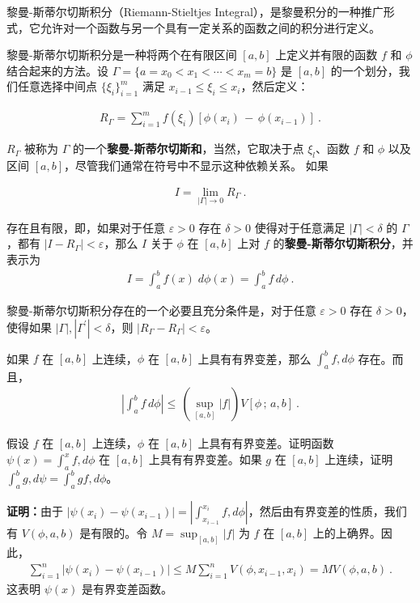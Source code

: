 
黎曼-斯蒂尔切斯积分（Riemann-Stieltjes Integral），是黎曼积分的一种推广形式，它允许对一个函数与另一个具有一定关系的函数之间的积分进行定义。

黎曼-斯蒂尔切斯积分是一种将两个在有限区间 $ [a, b] $ 上定义并有限的函数 $ f $ 和 $ \phi $ 结合起来的方法。设 $ \Gamma=\{a=x_{0}<x_{1}<\cdots<x_{m}=b\} $ 是 $ [a, b] $ 的一个划分，我们任意选择中间点 $ \{\xi_{i}\}_{i=1}^{m} $ 满足 $ x_{i-1}\leq\xi_{i}\leq x_{i} $，然后定义：

\begin{align}
R_{\Gamma}=\sum_{i=1}^{m}f(\xi_{i})[\phi(x_{i})\,-\,\phi(x_{i-1})]~.
\end{align}

$ R_{\Gamma} $ 被称为 $ \Gamma $ 的一个\textbf{黎曼-斯蒂尔切斯和}，当然，它取决于点 $ \xi_{l} $、函数 $ f $ 和 $ \phi $ 以及区间 $ [a, b] $，尽管我们通常在符号中不显示这种依赖关系。
如果

\begin{align}
I=\lim_{|\Gamma|\to0}R_{\Gamma}~.
\end{align}

存在且有限，即，如果对于任意 $ \varepsilon>0 $ 存在 $ \delta>0 $ 使得对于任意满足 $ |\Gamma|<\delta $ 的 $ \Gamma $，都有 $ |I-R_{\Gamma}|<\varepsilon $，那么 $ I $ 关于 $ \phi $ 在 $ [a, b] $ 上对 $ f $ 的\textbf{黎曼-斯蒂尔切斯积分}，并表示为
\begin{align}
I=\int_{a}^{b}\!f(x)\;d\phi(x)=\int_{a}^{b}\!f\,d\phi~.
\end{align}

黎曼-斯蒂尔切斯积分存在的一个必要且充分条件是，对于任意 $ \varepsilon>0 $ 存在 $ \delta>0 $，使得如果 $ |\Gamma|,|\Gamma^{\prime}|<\delta $，则 $ |R_{\Gamma}-R_{\Gamma}|<\varepsilon $。

\begin{theorem}{}
如果 $f$ 在 $[a,b]$ 上连续，$\phi$ 在 $[a,b]$ 上具有有界变差，那么 $ \int_{a}^{b}f,d\phi$ 存在。而且，
\begin{align}
  \left|\int_{a}^{b}f\,d\phi\right|\leq\,(\sup_{[a,b]}|f|)V[\phi\,;\,a,b]~.
\end{align}

\end{theorem}

\begin{example}{假设 $f$ 在 $[a,b]$ 上连续，$\phi$ 在 $[a,b]$ 上具有有界变差。证明函数 $\psi(x)=\int_{a}^{x}f,d\phi$ 在 $[a,b]$ 上具有有界变差。如果 $g$ 在 $[a,b]$ 上连续，证明 $\int_{a}^{b}g,d\psi=\int_{a}^{b}gf,d\phi$。}

\textbf{证明：}由于 $ |\psi(x_i) - \psi(x_{i-1})| = \left|\int_{x_{i-1}}^{x_i}f , d\phi\right| $，然后由有界变差的性质，我们有 $ V(\phi, a, b) $ 是有限的。令 $ M = \sup_{[a,b]}|f| $ 为 $ f $ 在 $ [a, b] $ 上的上确界。因此， \begin{align} \sum_{i=1}^n |\psi(x_i) - \psi(x_{i-1})| \leq M \sum_{i=1}^n V(\phi,x_{i-1},x_i) = MV(\phi,a,b)~. \end{align} 这表明 $ \psi(x) $ 是有界变差函数。
\end{example}

